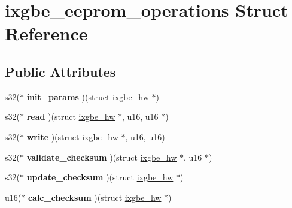 \hypertarget{structixgbe__eeprom__operations}{
\section{ixgbe\_\-eeprom\_\-operations Struct Reference}
\label{structixgbe__eeprom__operations}
}
\subsection*{Public Attributes}
\begin{DoxyCompactItemize}
\item 
\hypertarget{structixgbe__eeprom__operations_a01e42392659494fd7a5310ccf03f12c3}{
s32($\ast$ {\bfseries init\_\-params} )(struct \hyperlink{structixgbe__hw}{ixgbe\_\-hw} $\ast$)}
\label{structixgbe__eeprom__operations_a01e42392659494fd7a5310ccf03f12c3}

\item 
\hypertarget{structixgbe__eeprom__operations_a1696d99b0629f99b80180416da9d79ae}{
s32($\ast$ {\bfseries read} )(struct \hyperlink{structixgbe__hw}{ixgbe\_\-hw} $\ast$, u16, u16 $\ast$)}
\label{structixgbe__eeprom__operations_a1696d99b0629f99b80180416da9d79ae}

\item 
\hypertarget{structixgbe__eeprom__operations_a173288f43fef77bb9046e4fe27a79b47}{
s32($\ast$ {\bfseries write} )(struct \hyperlink{structixgbe__hw}{ixgbe\_\-hw} $\ast$, u16, u16)}
\label{structixgbe__eeprom__operations_a173288f43fef77bb9046e4fe27a79b47}

\item 
\hypertarget{structixgbe__eeprom__operations_a0ac6dbe3c498cc23464ebd62330b754e}{
s32($\ast$ {\bfseries validate\_\-checksum} )(struct \hyperlink{structixgbe__hw}{ixgbe\_\-hw} $\ast$, u16 $\ast$)}
\label{structixgbe__eeprom__operations_a0ac6dbe3c498cc23464ebd62330b754e}

\item 
\hypertarget{structixgbe__eeprom__operations_a4dabb376a14fa3ee1b331c990f2265b1}{
s32($\ast$ {\bfseries update\_\-checksum} )(struct \hyperlink{structixgbe__hw}{ixgbe\_\-hw} $\ast$)}
\label{structixgbe__eeprom__operations_a4dabb376a14fa3ee1b331c990f2265b1}

\item 
\hypertarget{structixgbe__eeprom__operations_a45cdfe55c89894966ff04f93e57e953d}{
u16($\ast$ {\bfseries calc\_\-checksum} )(struct \hyperlink{structixgbe__hw}{ixgbe\_\-hw} $\ast$)}
\label{structixgbe__eeprom__operations_a45cdfe55c89894966ff04f93e57e953d}

\end{DoxyCompactItemize}


